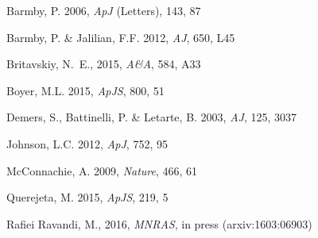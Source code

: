 \documentclass{iau}
\begin{document}
\begin{thebibliography}{}

{{Barmby,} P. \etal} 2006, \textit{ApJ} (Letters), 143, 87

{{Barmby,} P. \& {Jalilian}, F.F.} 2012, \textit{AJ}, 650, L45

{{Britavskiy}, N.~E., \etal}
2015, \textit{A\&A}, 584, A33

{{Boyer}, M.L. \etal} 2015, \textit{ApJS}, 800, 51

{{Demers}, S., {Battinelli}, P. \& {Letarte}, B.} 2003, \textit{AJ}, 125, 3037

{Johnson, L.C. \etal} 2012, \textit{ApJ}, 752, 95

{{McConnachie}, A. \etal} 2009, \textit{Nature}, 466, 61

{{Querejeta}, M. \etal} 2015, \textit{ApJS}, 219, 5

{{Rafiei Ravandi}, M., \etal}  2016, \textit{MNRAS}, in press (arxiv:1603:06903)


\end{thebibliography}
\end{document}
